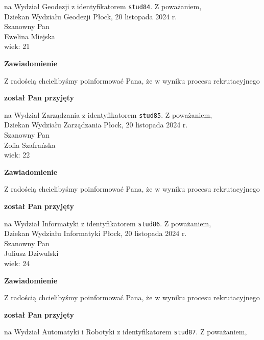 \documentclass[12pt,a4paper]{article}
\begin{document}
na Wydział Geodezji z identyfikatorem \verb|stud84|. 
\vspace{2cm}
\noindent
Z poważaniem,\\
Dziekan
Wydziału Geodezji
\newpage
\hfill Płock, 20 listopada 2024 r.\\
\noindent 
Szanowny Pan \\
Ewelina Miejska \\
wiek: 21
\bigskip
\begin{center}
 	{\Large\textbf{Zawiadomienie}}
\end{center}
\bigskip
Z radością chcielibyśmy poinformować Pana, że w wyniku procesu rekrutacyjnego 
\begin{center}
\textsf{\textbf{został Pan przyjęty}} 
\end{center}
na Wydział Zarządzania z identyfikatorem \verb|stud85|. 
\vspace{2cm}
\noindent
Z poważaniem,\\
Dziekan
Wydziału Zarządzania
\newpage
\hfill Płock, 20 listopada 2024 r.\\
\noindent 
Szanowny Pan \\
Zofia Szafrańska \\
wiek: 22
\bigskip
\begin{center}
 	{\Large\textbf{Zawiadomienie}}
\end{center}
\bigskip
Z radością chcielibyśmy poinformować Pana, że w wyniku procesu rekrutacyjnego 
\begin{center}
\textsf{\textbf{został Pan przyjęty}} 
\end{center}
na Wydział Informatyki z identyfikatorem \verb|stud86|. 
\vspace{2cm}
\noindent
Z poważaniem,\\
Dziekan
Wydziału Informatyki
\newpage
\hfill Płock, 20 listopada 2024 r.\\
\noindent 
Szanowny Pan \\
Juliusz Dziwulski \\
wiek: 24
\bigskip
\begin{center}
 	{\Large\textbf{Zawiadomienie}}
\end{center}
\bigskip
Z radością chcielibyśmy poinformować Pana, że w wyniku procesu rekrutacyjnego 
\begin{center}
\textsf{\textbf{został Pan przyjęty}} 
\end{center}
na Wydział Automatyki i Robotyki z identyfikatorem \verb|stud87|. 
\vspace{2cm}
\noindent
Z poważaniem,\\
\end{document}
